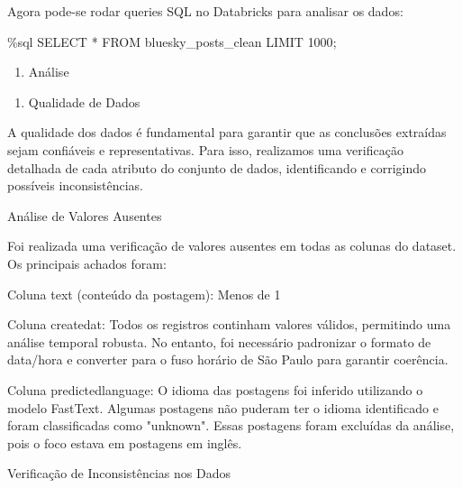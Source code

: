 \documentclass[
  letterpaper,
  DIV=11,
  numbers=noendperiod]{scrartcl}
\newenvironment{Shaded}{\begin{snugshade}}{\end{snugshade}}
\newcommand{\DecValTok}[1]{\textcolor[rgb]{0.68,0.00,0.00}{#1}}
\newcommand{\NormalTok}[1]{\textcolor[rgb]{0.00,0.23,0.31}{#1}}
\newcommand{\OperatorTok}[1]{\textcolor[rgb]{0.37,0.37,0.37}{#1}}
\providecommand{\tightlist}{%
  \setlength{\itemsep}{0pt}\setlength{\parskip}{0pt}}\usepackage{longtable,booktabs,array}
\begin{document}
Agora pode-se rodar queries SQL no Databricks para analisar os dados:

\begin{Shaded}
\begin{Highlighting}[]
\OperatorTok{\%}\NormalTok{sql}
\NormalTok{SELECT }\OperatorTok{*}\NormalTok{ FROM bluesky\_posts\_clean LIMIT }\DecValTok{1000}\OperatorTok{;}
\end{Highlighting}
\end{Shaded}

\begin{enumerate}
\def\labelenumi{\arabic{enumi}.}
\setcounter{enumi}{4}
\tightlist
\item
  Análise
\end{enumerate}

\begin{enumerate}
\def\labelenumi{\alph{enumi}.}
\tightlist
\item
  Qualidade de Dados
\end{enumerate}

A qualidade dos dados é fundamental para garantir que as conclusões
extraídas sejam confiáveis e representativas. Para isso, realizamos uma
verificação detalhada de cada atributo do conjunto de dados,
identificando e corrigindo possíveis inconsistências.

\begin{VerbatimWithBreaks}
Análise de Valores Ausentes 
 
\end{VerbatimWithBreaks}

Foi realizada uma verificação de valores ausentes em todas as colunas do
dataset. Os principais achados foram:

\begin{VerbatimWithBreaks}
Coluna text (conteúdo da postagem):  Menos de 1%

Coluna created\textunderscore at:  Todos os registros continham valores válidos, permitindo uma análise temporal robusta. No entanto, foi necessário padronizar o formato de data/hora e converter para o fuso horário de São Paulo para garantir coerência. 

Coluna predicted\textunderscore language:  O idioma das postagens foi inferido utilizando o modelo FastText. Algumas postagens não puderam ter o idioma identificado e foram classificadas como "unknown". Essas postagens foram excluídas da análise, pois o foco estava em postagens em inglês. 
 

Verificação de Inconsistências nos Dados 
 
\end{VerbatimWithBreaks}
\end{document}
